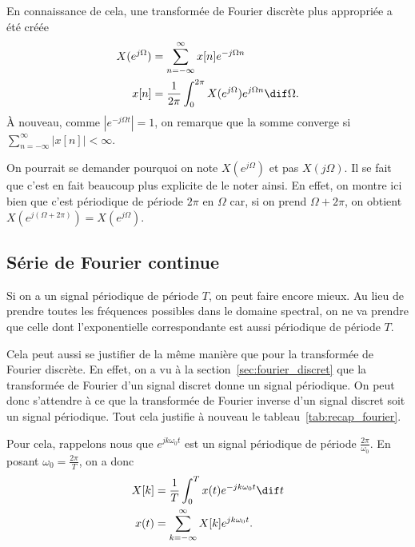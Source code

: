 En connaissance de cela, une transformée de Fourier discrète plus appropriée
a été créée
\begin{align*}
  X(e^{j\Omega}) & = \sum_{n=-\infty}^\infty x[n]e^{-j\Omega n}\\
  x[n] & = \frac{1}{2\pi}
  \int_{0}^{2\pi} X(e^{j\Omega})e^{j\Omega n} \dif \Omega.
\end{align*}
À nouveau, comme $|e^{-j\Omega t}| = 1$, on remarque que la somme
converge si $\sum_{n=-\infty}^\infty |x[n]| < \infty$.

On pourrait se demander pourquoi on note $X(e^{j\Omega})$ et pas $X(j\Omega)$.
Il se fait que c'est en fait beaucoup plus explicite de le noter ainsi.
En effet, on montre ici bien que c'est périodique de période $2\pi$
en $\Omega$ car, si on prend $\Omega + 2\pi$,
on obtient $X(e^{j(\Omega + 2\pi)}) = X(e^{j\Omega})$.

\subsection{Série de Fourier continue}
Si on a un signal périodique de période $T$, on peut faire encore mieux.
Au lieu de prendre toutes les fréquences possibles dans le domaine spectral,
on ne va prendre que celle dont l'exponentielle correspondante est
aussi périodique de période $T$.

Cela peut aussi se justifier de la même manière que pour
la transformée de Fourier discrète.
En effet, on a vu à la section~\ref{sec:fourier_discret}
que la transformée de Fourier d'un signal discret
donne un signal périodique.
On peut donc s'attendre à ce que la transformée de Fourier inverse d'un
signal discret soit un signal périodique.
Tout cela justifie à nouveau le tableau~\ref{tab:recap_fourier}.

Pour cela, rappelons nous que $e^{jk\omega_0t}$ est un signal périodique
de période $\frac{2\pi}{\omega_0}$.
En posant $\omega_0 = \frac{2\pi}{T}$, on a donc
\begin{align}
  \label{eq:sfc}
  X[k] & = \frac{1}{T}\int_0^T x(t) e^{-jk\omega_0t} \dif t\\
  \label{eq:sfci}
  x(t) & = \sum_{k=-\infty}^\infty X[k]e^{jk\omega_0t}.
\end{align}

